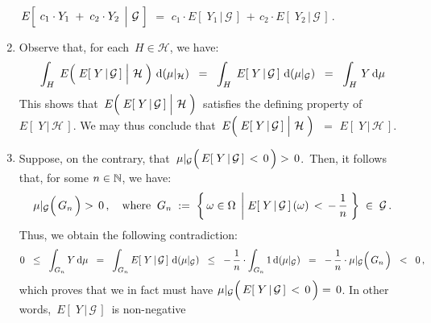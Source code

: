 \begin{enumerate}
	\,$E\!\left[\;\left.c_{1}\cdot Y_{1}\;\overset{{\color{white}.}}{+}\;c_{2}\cdot Y_{2}\,\;\right\vert\,\mathcal{G}\;\right]$
	\;$=$\;
	$c_{1}\cdot E\!\left[\;Y_{1}\,\vert\,\mathcal{G}\,\right] \,+\, c_{2}\cdot E\!\left[\;Y_{2}\,\vert\,\mathcal{G}\,\right]$\,.
\item
	Observe that, for each \,$H \in \mathcal{H}$, we have:
	\begin{eqnarray*}
	\int_{H}\;E\!\left(\,
		\left.\overset{{\color{white}.}}{E}\!\left[\;Y\,\vert\,\mathcal{G}\,\right]\;\right\vert\,\mathcal{H}
		\;\right)
		\,\d(\mu\vert_{\mathcal{H}})
	\;\; = \;\;	
		\int_{H}\;E\!\left[\;Y\,\vert\,\mathcal{G}\,\right]\,\d(\mu\vert_{\mathcal{G}})
	\;\; = \;\;	
		\int_{H}\,Y\,\d\mu
	\end{eqnarray*}
	This shows that
	\,$E\!\left(\,\left.\overset{{\color{white}.}}{E}\!\left[\;Y\,\vert\,\mathcal{G}\,\right]\;\right\vert\,\mathcal{H}\;\right)$\,
	satisfies the defining property of $E\!\left[\;Y\,\vert\,\mathcal{H}\,\right]$.
	We may thus conclude that
	\,$E\!\left(\,\left.\overset{{\color{white}.}}{E}\!\left[\;Y\,\vert\,\mathcal{G}\,\right]\;\right\vert\,\mathcal{H}\;\right)$\,
	$=$ $E\!\left[\;Y\,\vert\,\mathcal{H}\,\right]$.
\item
	Suppose, on the contrary, that
	\,$\mu\vert_{\mathcal{G}}\!\left(\,\overset{{\color{white}.}}{E}\!\left[\;Y\,\vert\,\mathcal{G}\,\right]\,<\,0\,\right) >\,0$.\,
	Then, it follows that, for some $n \in \mathbb{N}$, we have:
	\begin{equation*}
	\mu\vert_{\mathcal{G}}\!\left(\,\overset{{\color{white}.}}{G}_{n}\,\right) >\,0\,,
	\quad\textnormal{where}\;\;
	G_{n} \; :=\; \left\{\,
		\omega\in\Omega
		\;\left\vert\;
		\overset{{\color{white}.}}{E}\!\left[\;Y\,\vert\,\mathcal{G}\,\right](\omega)\,<\,-\,\dfrac{1}{n}
		\right.\,\right\}
		\;\in\;\mathcal{G}\,.
	\end{equation*}
	Thus, we obtain the following contradiction:
	\begin{equation*}
	0 \;\;\leq\;\; \int_{G_{n}} Y\,\d\mu
	\;\;=\;\; \int_{G_{n}} E\!\left[\;Y\,\vert\,\mathcal{G}\,\right]\,\d(\mu\vert_{\mathcal{G}})
	\;\;\leq\;\; -\,\dfrac{1}{n} \cdot \int_{G_{n}} 1\,\d(\mu\vert_{\mathcal{G}})
	\;\;=\;\; -\,\dfrac{1}{n} \cdot \mu\vert_{\mathcal{G}}\!\left(\,\overset{{\color{white}.}}{G}_{n}\,\right)
	\;\; < \;\; 0\,,
	\end{equation*}
	which proves that we in fact must have
	$\mu\vert_{\mathcal{G}}\!\left(\,\overset{{\color{white}.}}{E}\!\left[\;Y\,\vert\,\mathcal{G}\,\right]\,<\,0\,\right) =\,0$.
	In other words, \,$E\!\left[\;Y\,\vert\,\mathcal{G}\,\right]$\, is non-negative

\end{enumerate}
